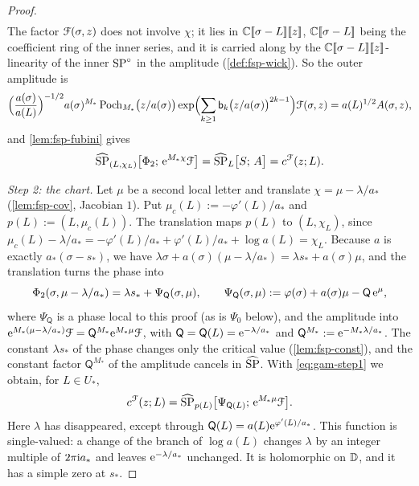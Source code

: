\begin{proof}
\begin{align*}
\end{align*}
The factor $\mathcal{F}(\sigma,z)$ does not involve $\chi$; it lies in $\mathbb{C}[\![ \sigma-L ]\!][\![ z ]\!]$, $\mathbb{C}[\![ \sigma-L ]\!]$ being the coefficient ring of the inner series, and it is carried along by the $\mathbb{C}[\![ \sigma-L ]\!][\![ z ]\!]$-linearity of the inner $\mathrm{SP}^{\circ}$ in the amplitude (\cref{def:fsp-wick}). So the outer amplitude is
\[
\Bigl(\frac{a(\sigma)}{a(L)}\Bigr)^{-1/2}a(\sigma)^{M_*}\,\mathrm{Poch}_{M_*}\bigl(z/a(\sigma)\bigr)\exp\Bigl(\sum_{k\geq1}\mathsf{b}_k\bigl(z/a(\sigma)\bigr)^{2k-1}\Bigr)\mathcal{F}(\sigma,z)=a(L)^{1/2}A(\sigma,z),
\]
and \cref{lem:fsp-fubini} gives
\begin{equation}
\label{eq:gam-step1}
\widehat{\mathrm{SP}}_{(L,\chi_L)}\bigl[\Phi_2;\,\mathrm{e}^{M_*\chi}\mathcal{F}\bigr]=\widehat{\mathrm{SP}}_L\bigl[S;\,A\bigr]=c^{\mathcal{F}}(z;L).
\end{equation}

\emph{Step 2: the chart.} Let $\mu$ be a second local letter and translate $\chi=\mu-\lambda/a_*$ (\cref{lem:fsp-cov}, Jacobian $1$). Put $\mu_c(L):=-\varphi'(L)/a_*$ and $p(L):=(L,\mu_c(L))$. The translation maps $p(L)$ to $(L,\chi_L)$, since $\mu_c(L)-\lambda/a_*=-\varphi'(L)/a_*+\varphi'(L)/a_*+\log a(L)=\chi_L$. Because $a$ is exactly $a_*(\sigma-s_*)$, we have $\lambda\sigma+a(\sigma)(\mu-\lambda/a_*)=\lambda s_*+a(\sigma)\mu$, and the translation turns the phase into
\[
\Phi_2(\sigma,\mu-\lambda/a_*)=\lambda s_*+\Psi_{\mathsf Q}(\sigma,\mu),\qquad \Psi_{\mathsf Q}(\sigma,\mu):=\varphi(\sigma)+a(\sigma)\mu-\mathsf Q\,\mathrm{e}^{\mu},
\]
where $\Psi_{\mathsf Q}$ is a phase local to this proof (as is $\Psi_0$ below), and the amplitude into $\mathrm{e}^{M_*(\mu-\lambda/a_*)}\mathcal{F}=\mathsf Q^{M_*}\mathrm{e}^{M_*\mu}\mathcal{F}$, with $\mathsf Q=\mathsf Q(L)=\mathrm{e}^{-\lambda/a_*}$ and $\mathsf Q^{M_*}:=\mathrm{e}^{-M_*\lambda/a_*}$. The constant $\lambda s_*$ of the phase changes only the critical value (\cref{lem:fsp-const}), and the constant factor $\mathsf Q^{M_*}$ of the amplitude cancels in $\widehat{\mathrm{SP}}$. With \eqref{eq:gam-step1} we obtain, for $L\in U_*$,
\begin{equation}
\label{eq:gam-chart}
c^{\mathcal{F}}(z;L)=\widehat{\mathrm{SP}}_{p(L)}\bigl[\Psi_{\mathsf Q(L)};\,\mathrm{e}^{M_*\mu}\mathcal{F}\bigr].
\end{equation}
Here $\lambda$ has disappeared, except through $\mathsf Q(L)=a(L)\mathrm{e}^{\varphi'(L)/a_*}$. This function is single-valued: a change of the branch of $\log a(L)$ changes $\lambda$ by an integer multiple of $2\pi\mathrm{i} a_*$ and leaves $\mathrm{e}^{-\lambda/a_*}$ unchanged. It is holomorphic on $\mathbb{D}$, and it has a simple zero at $s_*$.


\end{proof}

